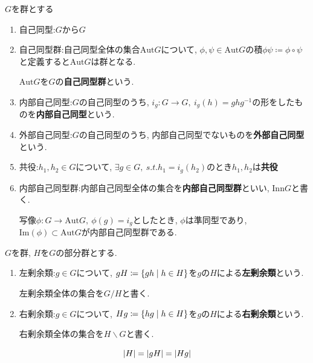 \begin{deftcolorbox}[title=自己同型群]
    $G$を群とする
    \begin{enumerate}
        \item 自己同型:$G$から$G$
        \item 自己同型群:自己同型全体の集合$\mathrm{Aut}G$について, $\phi, \psi \in \mathrm{Aut}G$の積$\phi \psi\coloneq \phi \circ \psi$と定義すると$\mathrm{Aut}G$は群となる.

        $\mathrm{Aut}G$を$G$の\textbf{自己同型群}という.
        \item 内部自己同型:$G$の自己同型のうち, $i_g : G\rightarrow G,\ i_g(h) = ghg^{-1}$の形をしたものを\textbf{内部自己同型}という.
        \item 外部自己同型:$G$の自己同型のうち, 内部自己同型でないものを\textbf{外部自己同型}という.
        \item 共役:$h_1, h_2 \in G$について, $\exists g \in G ,\ s.t. h_1 = i_g(h_2)$のとき$h_1, h_2$は\textbf{共役}
        \item 内部自己同型群:内部自己同型全体の集合を\textbf{内部自己同型群}といい, $\mathrm{Inn}G$と書く.

        写像$\phi:G \rightarrow \mathrm{Aut}G,\ \phi(g) = i_g$としたとき, $\phi$は準同型であり, $\mathrm{Im}(\phi) \subset \mathrm{Aut}G$が内部自己同型群である.
    \end{enumerate}
\end{deftcolorbox}

\begin{deftcolorbox}[title = 正規部分群]
    $G$を群, $H$を$G$の部分群とする.
    \begin{enumerate}
        \item 左剰余類:$g \in G$について, $gH \coloneq \qty{gh \mid h \in H }$を$g$の$H$による\textbf{左剰余類}という.
        
        左剰余類全体の集合を$G/H$と書く.
        \item 右剰余類:$g \in G$について, $Hg \coloneq \qty{hg \mid h \in H }$を$g$の$H$による\textbf{右剰余類}という.
        
        右剰余類全体の集合を$H\backslash G$と書く.
    \end{enumerate}
\end{deftcolorbox}

\begin{theotcolorbox}
    \begin{equation*}
        \qty|H| = \qty|gH| = \qty|Hg|
    \end{equation*}
\end{theotcolorbox}


